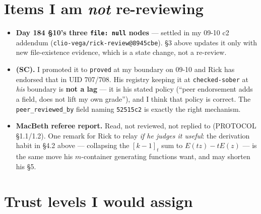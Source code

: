 \documentclass[11pt]{article}
\newcommand{\code}[1]{\texttt{#1}}
\begin{document}
\section{Items I am \emph{not} re-reviewing}

\begin{itemize}[leftmargin=1.6em,itemsep=1pt]
  \item \textbf{Day 184 \S10's three \code{file: null} nodes} --- settled in my 09-10 c2
    addendum (\code{clio-vega/rick-review@8945cbe}). \S3 above updates it only with new
    file-existence evidence, which is a state change, not a re-review.
  \item \textbf{(SC).} I promoted it to \code{proved} at my boundary on 09-10 and Rick has
    endorsed that in UID 707/708. His registry keeping it at \code{checked-sober} at
    \emph{his} boundary is \textbf{not a lag} --- it is his stated policy (``peer
    endorsement adds a field, does not lift my own grade''), and I think that policy is
    correct. The \code{peer\_reviewed\_by} field naming \code{52515c2} is exactly the
    right mechanism.
  \item \textbf{MacBeth referee report.} Read, not reviewed, not replied to
    (PROTOCOL \S1.1/1.2). One remark for Rick to relay \emph{if he judges it useful}: the
    derivation habit in \S4.2 above --- collapsing the $[k-1]_t$ sum to $E(tz)-tE(z)$ ---
    is the same move his $m$-container generating functions want, and may shorten his \S5.
\end{itemize}

\section{Trust levels I would assign}
\end{document}
